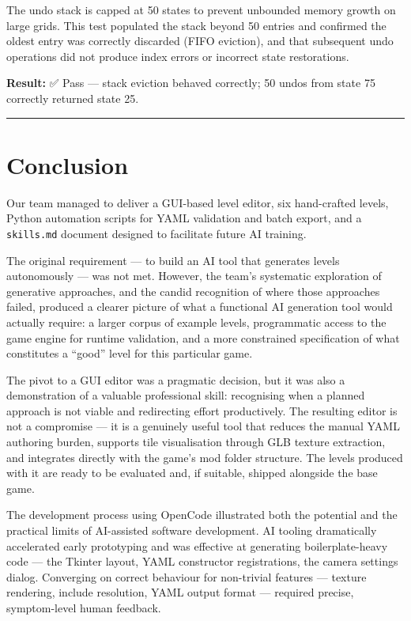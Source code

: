 The undo stack is capped at 50 states to prevent unbounded memory growth
on large grids. This test populated the stack beyond 50 entries and
confirmed the oldest entry was correctly discarded (FIFO eviction), and
that subsequent undo operations did not produce index errors or
incorrect state restorations.

\textbf{Result:} ✅ Pass --- stack eviction behaved correctly; 50 undos
from state 75 correctly returned state 25.

\begin{center}\rule{0.5\linewidth}{0.5pt}\end{center}

\section{Conclusion}\label{conclusion}

Our team managed to deliver a GUI-based level editor, six hand-crafted
levels, Python automation scripts for YAML validation and batch export,
and a \texttt{skills.md} document designed to facilitate future AI
training.

The original requirement --- to build an AI tool that generates levels
autonomously --- was not met. However, the team's systematic exploration
of generative approaches, and the candid recognition of where those
approaches failed, produced a clearer picture of what a functional AI
generation tool would actually require: a larger corpus of example
levels, programmatic access to the game engine for runtime validation,
and a more constrained specification of what constitutes a ``good''
level for this particular game.

The pivot to a GUI editor was a pragmatic decision, but it was also a
demonstration of a valuable professional skill: recognising when a
planned approach is not viable and redirecting effort productively. The
resulting editor is not a compromise --- it is a genuinely useful tool
that reduces the manual YAML authoring burden, supports tile
visualisation through GLB texture extraction, and integrates directly
with the game's mod folder structure. The levels produced with it are
ready to be evaluated and, if suitable, shipped alongside the base game.

The development process using OpenCode illustrated both the potential
and the practical limits of AI-assisted software development. AI tooling
dramatically accelerated early prototyping and was effective at
generating boilerplate-heavy code --- the Tkinter layout, YAML
constructor registrations, the camera settings dialog. Converging on
correct behaviour for non-trivial features --- texture rendering,
include resolution, YAML output format --- required precise,
symptom-level human feedback.

